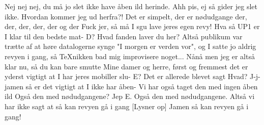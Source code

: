 \documentclass[a4paper,11pt]{article}
\begin{document}
\begin{sketch}
 Nej nej nej, du må jo slet ikke have åben ild herinde.
 Ahh pis, ej så gider jeg slet ikke. Hvordan kommer jeg ud herfra?!
  Det er simpelt, der er nødudgange der, der, der, der, der og der
 Fuck jer, så må I sgu lave jeres egen revy!
 Hva så UP1 er I klar til den bedste mat-
 D? Hvad fanden laver du her?
 Altså publikum var trætte af at høre datalogerne synge "I morgen er verden vor", og I satte jo aldrig revyen i gang, så TeXnikken bad mig improvisere noget...
 Nånå men jeg er altså klar nu, så du kan bare smutte
 Mine damer og herre, først og fremmest det er yderst vigtigt at I har jeres mobiller slu-
 E? Det er allerede blevet sagt
 Hvad? J-j-jamen så er det vigtigt at I ikke har åben-
 Vi har også taget den med ingen åben ild
 Også den med nødudgangene?
 Jep E. Også den med nødudgangene.
 Altså vi har ikke sagt at så kan revyen gå i gang
[Lysner op] Jamen så kan revyen gå i gang! 

\end{sketch}
\end{document}
